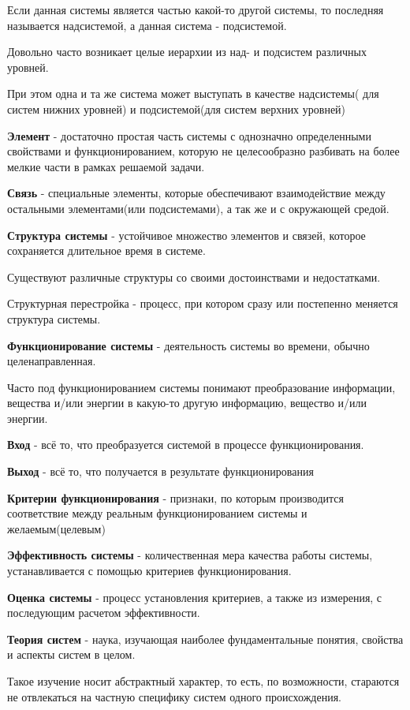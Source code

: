 \documentclass[a4paper]{article}
\begin{document}
	Если данная системы является частью какой-то другой системы, то последняя называется надсистемой, а данная система - подсистемой.
	
	Довольно часто возникает целые иерархии из над- и подсистем различных уровней.
	
	При этом одна и та же система может выступать в качестве надсистемы( для систем нижних уровней) и подсистемой(для систем верхних уровней)
	
	\textbf{Элемент} - достаточно простая часть системы с однозначно определенными свойствами и функционированием, которую не целесообразно разбивать на более мелкие части в рамках решаемой задачи.
	
	\textbf{Связь} - специальные элементы, которые обеспечивают взаимодействие между остальными элементами(или подсистемами), а так же и с окружающей средой.
	
	\textbf{Структура системы} - устойчивое множество элементов и связей, которое сохраняется длительное время в системе.
	
	Существуют различные структуры со своими достоинствами и недостатками.
	
	Структурная перестройка - процесс, при котором сразу или постепенно меняется структура системы.
	
	\textbf{Функционирование системы} - деятельность системы во времени, обычно целенаправленная.
	
	Часто под функционированием системы понимают преобразование информации, вещества и/или энергии в какую-то другую информацию, вещество и/или энергии.
	
	\textbf{Вход} - всё то, что преобразуется системой в процессе функционирования.
	
	\textbf{Выход} - всё то, что получается в результате функционирования
	
	\textbf{Критерии функционирования} - признаки, по которым производится соответствие между реальным функционированием системы и желаемым(целевым)
	
	\textbf{Эффективность системы} - количественная мера качества работы системы, устанавливается с помощью критериев функционирования.
	
	\textbf{Оценка системы} - процесс установления критериев, а также из измерения, с последующим расчетом эффективности.
	
	\textbf{Теория систем} - наука, изучающая наиболее фундаментальные понятия, свойства и аспекты систем в целом.
	
	Такое изучение носит абстрактный характер, то есть, по возможности, стараются не отвлекаться на частную специфику систем одного происхождения.
	
\end{document}
